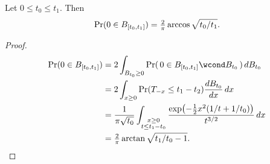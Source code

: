 \begin	{theorem}
Let \( 0 \le t_0 \le t_1\).
Then \[
	\Pr(0 \in B_{[t_0,t_1]}) = \tfrac2\pi\arccos\sqrt{t_0/t_1} \text.
\]
\end	{theorem}
\begin	{proof}
\begin	{align*}
	\Pr(0 \in B_{[t_0,t_1]})
	&=	2\int_{B_{t_0}\ge0}
			\Pr(\, 0 \in B_{[t_0,t_1]} \wcond B_{t_0} \,)
		\,dB_{t_0} \\
	&=	2\int_{x\ge0} \Pr( T_{-x} \le t_1-t_2 )
			\frac{dB_{t_0}}{dx} \,dx \\
	&=	\frac1{\pi\sqrt{t_0}}
		\int_{\substack{x\ge0\\t\le t_1-t_0}}
		\frac {\exp\bigl(-\tfrac12x^2(1/t+1/t_0)\bigr)}{t^{3/2}}
		\,dx \\
	&=	\tfrac2\pi\arctan\sqrt{t_1/t_0-1} \text.
	\qedhere
\end	{align*}
\end	{proof}
